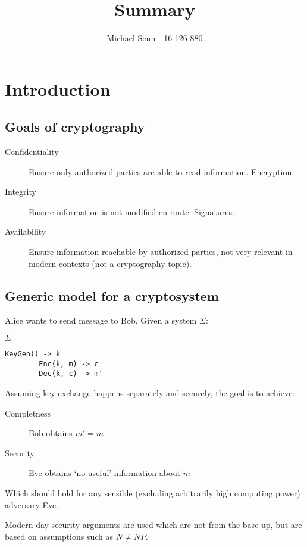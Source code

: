 \documentclass[a4paper]{scrreprt}
\title{Summary}
\author{Michael Senn \maillink{michael.senn@students.unibe.ch} - 16-126-880}
\date{\printdate}
\begin{document}
\maketitle


\chapter{Introduction}

\section{Goals of cryptography}

\begin{description}
	\item[Confidentiality] Ensure only authorized parties are able to read
		information. Encryption.
	\item[Integrity] Ensure information is not modified en-route.
		Signatures.
	\item[Availability] Ensure information reachable by authorized parties,
		not very relevant in modern contexts (not a cryptography
		topic).
\end{description}

\section{Generic model for a cryptosystem}

Alice wants to send message to Bob. Given a system $\Sigma$:

\begin{library}{$\Sigma$}
	\begin{lstlisting}[mathescape=true,autogobble=true]
		KeyGen() -> k
		Enc(k, m) -> c
		Dec(k, c) -> m'
	\end{lstlisting}
\end{library}

Assuming key exchange happens separately and securely, the goal is to achieve:
\begin{description}
	\item[Completness] Bob obtains $m' = m$
	\item[Security] Eve obtains `no useful' information about $m$
\end{description}

Which should hold for any sensible (excluding arbitrarily high computing power)
adversary Eve.

Modern-day security arguments are used which are not from the base up, but are
based on assumptions such as $N \neq NP$.
\end{document}
